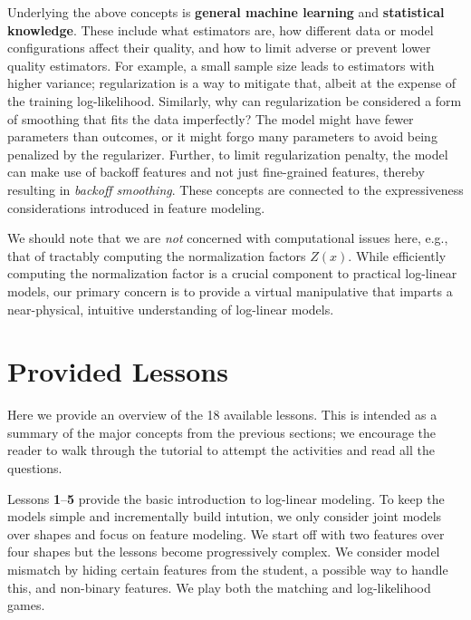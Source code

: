 \documentclass[11pt,letterpaper]{article}
\newcommand{\Note}[1]{}
\renewcommand{\Note}[1]{\hl{[#1]}}  %
\newcommand{\NoteSigned}[3]{{\sethlcolor{#2}\Note{#1: #3}}}
\newcommand{\NoteFF}[1]{\NoteSigned{FF}{LightBlue}{#1}}
\newcommand{\NumLessons}[0]{18}%
\begin{document}
Underlying the above concepts is \textbf{general machine learning} and 
\textbf{statistical knowledge}. These include what estimators are,  how different data or model configurations 
affect their quality, and how to limit adverse or prevent lower quality estimators. For example, 
a small sample size leads to estimators with higher variance; regularization is a way to mitigate that, albeit at the expense of 
the training log-likelihood. 
Similarly, why can regularization be considered a form of smoothing that fits the data 
imperfectly? The model might have fewer parameters than 
outcomes, or it might forgo many parameters to avoid being penalized by 
the regularizer.  Further, to limit regularization penalty, the model can make 
use of backoff features and not just fine-grained features, thereby resulting 
in \textit{backoff smoothing}. These concepts are connected to the expressiveness 
considerations introduced in feature modeling.

We should note that we are \textit{not} concerned with computational issues here, e.g., that of 
tractably computing the normalization factors $Z(x)$. While efficiently computing the normalization 
factor is a crucial component to practical log-linear models, our primary concern is to provide a virtual 
manipulative that imparts a near-physical, intuitive understanding of log-linear models. 



\section{Provided Lessons}\label{sec:lessons}
Here we provide an overview of the \NumLessons{} available lessons. This is intended as a 
summary of the major concepts from the previous sections; we encourage the reader to 
walk through the tutorial to attempt the activities and read all the questions.

Lessons \textbf{1}--\textbf{5} provide the basic introduction to log-linear modeling. To keep 
the models simple and incrementally build intution, we only consider joint models over shapes and focus 
on feature modeling. We start off with two features over four shapes but the lessons 
become progressively complex. We consider model mismatch by hiding certain 
features from the student, a possible way to handle this, and non-binary features. We play both the 
matching and log-likelihood games.
\end{document}
